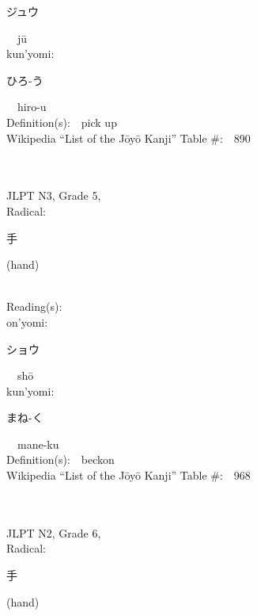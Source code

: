 \begin{multicols}{2}
{\hspace*{2em}}{\begin{CJK}{UTF8}{min} ジュウ \end{CJK}}\ \ j\=u\ \ \\
{\hspace*{1em}}kun'yomi:\ \ \\
{\hspace*{2em}}{\begin{CJK}{UTF8}{min} ひろ-う \end{CJK}}\ \ hiro-u\ \ \\
Definition(s):\ \ pick up \\
Wikipedia ``List of the J\=oy\=o Kanji'' Table \#:\ \ 890 \\
\ \ \\
{\fontsize{34pt}{40pt}  }\ \ \\  %
{JLPT N3, Grade 5, \\Radical:\ \ {\begin{CJK}{UTF8}{min} 手 \end{CJK}} (hand) } \\
Reading(s):\ \ \\
{\hspace*{1em}}on'yomi:\ \ \\
{\hspace*{2em}}{\begin{CJK}{UTF8}{min} ショウ \end{CJK}}\ \ sh\=o\ \ \\
{\hspace*{1em}}kun'yomi:\ \ \\
{\hspace*{2em}}{\begin{CJK}{UTF8}{min} まね-く \end{CJK}}\ \ mane-ku\ \ \\
Definition(s):\ \ beckon \\
Wikipedia ``List of the J\=oy\=o Kanji'' Table \#:\ \ 968 \\
\ \ \\
{\fontsize{34pt}{40pt}  }\ \ \\  %
{JLPT N2, Grade 6, \\Radical:\ \ {\begin{CJK}{UTF8}{min} 手 \end{CJK}} (hand) } \\

\end{multicols}
